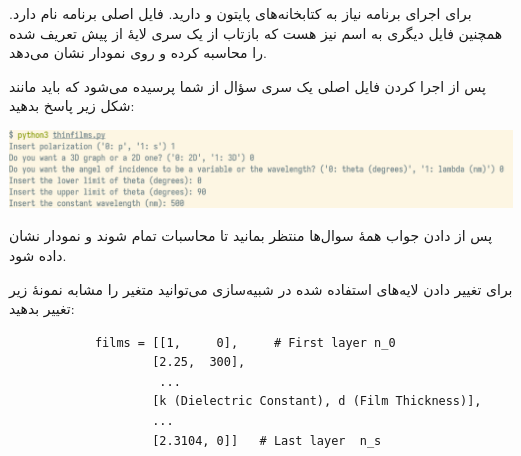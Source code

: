 \documentclass{article}
\begin{document}
		برای اجرای برنامه نیاز به کتابخانه‌های پایتون  و  دارید. فایل اصلی برنامه  نام دارد. همچنین فایل دیگری به اسم  نیز هست که بازتاب از یک سری لایهٔ از پیش تعریف شده را محاسبه کرده و روی نمودار نشان می‌دهد.
		
		پس از اجرا کردن فایل اصلی یک سری سؤال از شما پرسیده می‌شود که باید مانند شکل زیر پاسخ بدهید:
		
	\begin{center}
		\includegraphics[height=0.15\linewidth]{questions.png}
	\end{center}
		
		پس از دادن جواب همهٔ سوال‌ها منتظر بمانید تا محاسبات تمام شوند و نمودار نشان داده شود.
		
		برای تغییر دادن لایه‌های استفاده شده در شبیه‌سازی می‌توانید متغیر  را مشابه نمونهٔ زیر تغییر بدهید:
		
	\begin{latin}
		\begin{verbatim}
            films = [[1,     0],     # First layer n_0
                    [2.25,  300],
                     ...
                    [k (Dielectric Constant), d (Film Thickness)],
                    ...
                    [2.3104, 0]]   # Last layer  n_s
		\end{verbatim}
	\end{latin}
	
	
	
	
	
	
	
	
	
\end{document}

